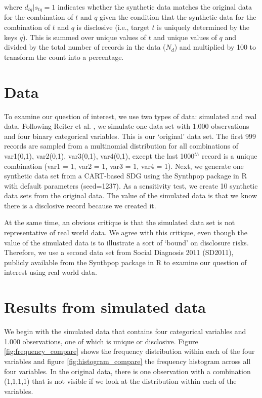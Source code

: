 \documentclass[runningheads]{llncs}
\begin{document}
where $d_{tq} | s_{tq} = 1$ indicates whether the synthetic data matches the original data for the combination of $t$ and $q$ given the condition that the synthetic data for the combination of $t$ and $q$ is disclosive (i.e., target $t$ is uniquely determined by the keys $q$).  This is summed over unique values of $t$ and unique values of $q$ and divided by the total number of records in the data ($N_{d}$) and multiplied by 100 to transform the count into a percentage.

\section{Data}

To examine our question of interest, we use two types of data: simulated and real data.  Following Reiter et al. \cite{reiter2014bayesian}, we simulate one data set with 1.000 observations and four binary categorical variables.  This is our `original' data set.  The first 999 records are sampled from a multinomial distribution for all combinations of var1(0,1), var2(0,1), var3(0,1), var4(0,1), except the last 1000$^{th}$ record is a unique combination (var1 = 1, var2 = 1, var3 = 1, var4 = 1).  Next, we generate one synthetic data set from a CART-based SDG using the Synthpop package in R with default parameters (seed=1237).  As a sensitivity test, we create 10 synthetic data sets from the original data.  The value of the simulated data is that we know there is a disclosive record because we created it.

At the same time, an obvious critique is that the simulated data set is not representative of real world data.  We agree with this critique, even though the value of the simulated data is to illustrate a sort of `bound' on disclosure risks.  Therefore, we use a second data set from Social Diagnosis 2011 (SD2011), publicly available from the Synthpop package in R to examine our question of interest using real world data.

\section{Results from simulated data}

We begin with the simulated data that contains four categorical variables and 1.000 observations, one of which is unique or disclosive. Figure \ref{fig:frequency_compare} shows the frequency distribution within each of the four variables and figure \ref{fig:histogram_compare} the frequency histogram across all four variables.  In the original data, there is one observation with a combination (1,1,1,1) that is not visible if we look at the distribution within each of the variables.  
\end{document}

